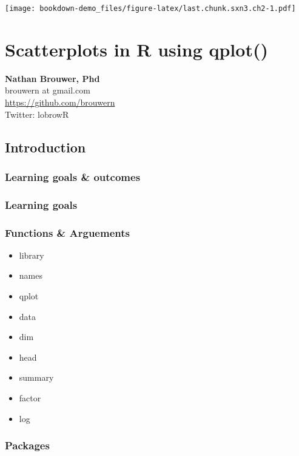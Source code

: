 \documentclass[]{book}
\providecommand{\tightlist}{%
  \setlength{\itemsep}{0pt}\setlength{\parskip}{0pt}}
\theoremstyle{definition}
\theoremstyle{definition}
\theoremstyle{definition}
\theoremstyle{remark}
\begin{document}
\texttt{[image: bookdown-demo\_files/figure-latex/last.chunk.sxn3.ch2-1.pdf]}

\chapter{Scatterplots in R using
qplot()}\label{scatterplots-in-r-using-qplot}

\textbf{Nathan Brouwer, Phd}\\
brouwern at gmail.com\\
\url{https://github.com/brouwern}\\
Twitter: lobrowR

\section{Introduction}\label{introduction-7}

\subsection*{Learning goals \&
outcomes}\label{learning-goals-outcomes-2}

\subsection*{Learning goals}\label{learning-goals-3}

\subsection*{Functions \& Arguements}\label{functions-arguements-5}

\begin{itemize}
\tightlist
\item
  library
\item
  names
\item
  qplot
\item
  data
\item
  dim
\item
  head
\item
  summary
\item
  factor
\item
  log
\end{itemize}

\subsection*{Packages}\label{packages-6}
\end{document}
